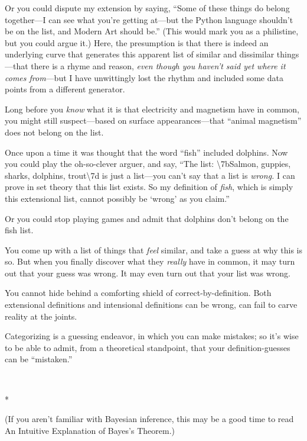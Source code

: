 {
 Or you could dispute my extension by saying,
``Some of these things do belong together---I can see
what you're getting at---but the Python language
shouldn't be on the list, and Modern Art should
be.'' (This would mark you as a philistine, but you
could argue it.) Here, the presumption is that there is indeed an
underlying curve that generates this apparent list of similar and
dissimilar things---that there is a rhyme and reason, \textit{even
though you haven't said yet where it comes
from}{}---but I have unwittingly lost the rhythm and included some data
points from a different generator.}

{
 Long before you \textit{know} what it is that electricity and
magnetism have in common, you might still suspect---based on surface
appearances---that ``animal
magnetism'' does not belong on the list.}

{
 Once upon a time it was thought that the word
``fish'' included dolphins. Now you
could play the oh-so-clever arguer, and say, ``The
list: {\textbackslash}{\textquotesingle}7bSalmon, guppies, sharks,
dolphins, trout{\textbackslash}{\textquotesingle}7d is just a
list---you can't say that a list is \textit{wrong.} I
can prove in set theory that this list exists. So my definition of
\textit{fish}, which is simply this extensional list, cannot possibly
be `wrong' as you
claim.''}

{
 Or you could stop playing games and admit that dolphins
don't belong on the fish list.}

{
 You come up with a list of things that \textit{feel} similar, and
take a guess at why this is so. But when you finally discover what they
\textit{really} have in common, it may turn out that your guess was
wrong. It may even turn out that your list was wrong.}

{
 You cannot hide behind a comforting shield of
correct-by-definition. Both extensional definitions and intensional
definitions can be wrong, can fail to carve reality at the joints.}

{
 Categorizing is a guessing endeavor, in which you can make
mistakes; so it's wise to be able to admit, from a
theoretical standpoint, that your definition-guesses can be
``mistaken.''}

{\centering
 \ ~
\par}

{\centering
 *
\par}


{
 (If you aren't familiar with Bayesian inference,
this may be a good time to read An Intuitive Explanation of
Bayes's Theorem.) }

